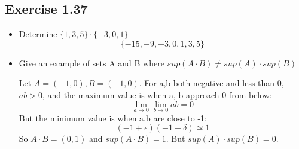 \documentclass[12pt]{article}
\begin{document}
		\subsection*{Exercise 1.37}
			\begin{itemize}
				\item Determine $\{1,3,5\} \cdot \{-3,0,1\}$
					\begin{equation}
						\{-15, -9, -3, 0, 1, 3, 5\}
					\end{equation}
				
				\item Give an example of sets A and B where $sup(A \cdot B) \ne sup(A) \cdot sup(B)$
					
					Let $A = (-1, 0), B = (-1, 0)$. For a,b both negative and less than 0,$ ab > 0$, and the maximum value is when a, b approach 0 from below:
					\begin{equation}
						\lim_{a\rightarrow 0}\lim_{b \rightarrow 0} ab = 0
					\end{equation}
					But the minimum value is when a,b are close to -1:
					\begin{equation}
						(-1 + \epsilon)(-1 + \delta) \simeq 1
					\end{equation}
					So $A \cdot B = (0, 1)$ and $sup(A \cdot B) = 1$.
					But $sup(A)\cdot sup(B) = 0$.
			\end{itemize}
\end{document}
